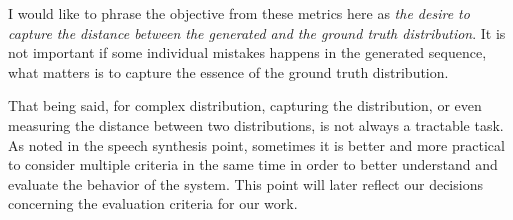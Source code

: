   \par I would like to phrase the objective from these metrics here as \textit{the desire to capture the distance between the generated and the ground truth distribution}. It is not important if some individual mistakes happens in the generated sequence, what matters is to capture the essence of the ground truth distribution.

  \par That being said, for complex distribution, capturing the distribution, or even measuring the distance between two distributions, is not always a tractable task. As noted in the speech synthesis point, sometimes it is better and more practical to consider multiple criteria in the same time in order to better understand and evaluate the behavior of the system. This point will later reflect our decisions concerning the evaluation  criteria for our work.

